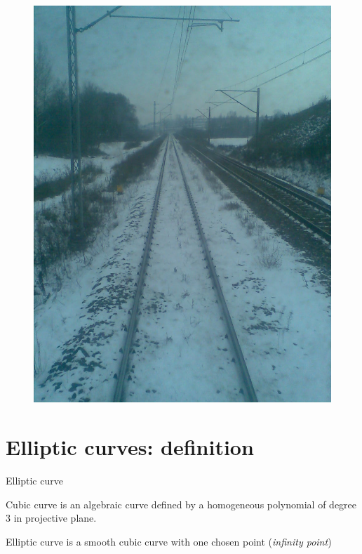 \documentclass[aspectratio=169,xcolor=dvipsnames]{beamer}
\begin{document}
\begin{frame}{}
\begin{figure}
    \centering
    \includegraphics[height=0.9\textheight]{track.jpg}
\end{figure}
\end{frame}


\section{Elliptic curves: definition}

\begin{frame}{Elliptic curve}
\begin{definition}
    Cubic curve is an algebraic curve defined by a homogeneous polynomial of degree 3 in projective plane.
\end{definition}
\begin{definition}
    Elliptic curve is a smooth cubic curve with one chosen point (\textit{infinity point})
\end{definition}
\end{frame}
\end{document}
